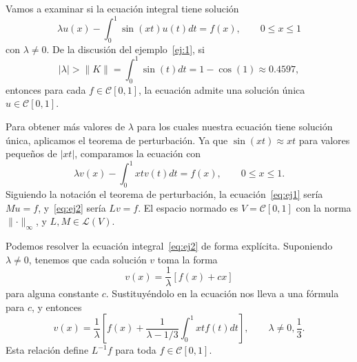 \begin{ejemplo}
	Vamos a examinar si la ecuación integral tiene solución
	\begin{equation}\label{eq:ej1}
		\lambda u(x) - \int_{0}^{1}\sin(xt)u(t)dt = f(x), \qquad 0 \leqslant x \leqslant 1
	\end{equation}
	con $\lambda \neq 0$. De la discusión del ejemplo~\eqref{ej:1}, si
	\begin{equation}\label{ej:2}
		|\lambda| > \lVert K \rVert = \int_{0}^{1}\sin(t)dt = 1 - \cos(1) \approx 0.4597,
	\end{equation}
	entonces para cada $f \in \mathcal{C}[0,1]$, la ecuación admite una solución única $u \in \mathcal{C}[0,1]$.
	
	Para obtener más valores de $\lambda$ para los cuales nuestra ecuación tiene solución única, aplicamos el teorema de perturbación. Ya que $\sin(xt) \approx xt$ para valores pequeños de $|xt|$, comparamos la ecuación con
	\begin{equation}\label{eq:ej2}
		\lambda v(x) - \int_{0}^{1} xtv(t)dt = f(x), \qquad 0 \leqslant x \leqslant 1.
	\end{equation}
	Siguiendo la notación el teorema de perturbación, la ecuación~\eqref{eq:ej1} sería $Mu = f$, y~\eqref{eq:ej2} sería $Lv = f$. El espacio normado es $V = \mathcal{C}[0,1]$ con la norma $\lVert \cdot \rVert_\infty$, y $L,M \in \mathcal{L}(V)$.
	
	Podemos resolver la ecuación integral~\eqref{eq:ej2} de forma explícita. Suponiendo $\lambda \neq 0$, tenemos que cada solución $v$ toma la forma
	\begin{equation}
		v(x) = \dfrac{1}{\lambda}[f(x)+cx]
	\end{equation}
	para alguna constante $c$. Sustituyéndolo en la ecuación nos lleva a una fórmula para $c$, y entonces
	\begin{equation}
		v(x) = \dfrac{1}{\lambda}[f(x) + \dfrac{1}{\lambda - 1/3}\int_{0}^{1}xtf(t)dt], \qquad \lambda \neq 0,\dfrac{1}{3}.
	\end{equation}
	Esta relación define $L^{-1}f$ para toda $f \in \mathcal{C}[0,1]$.
	

\end{ejemplo}

